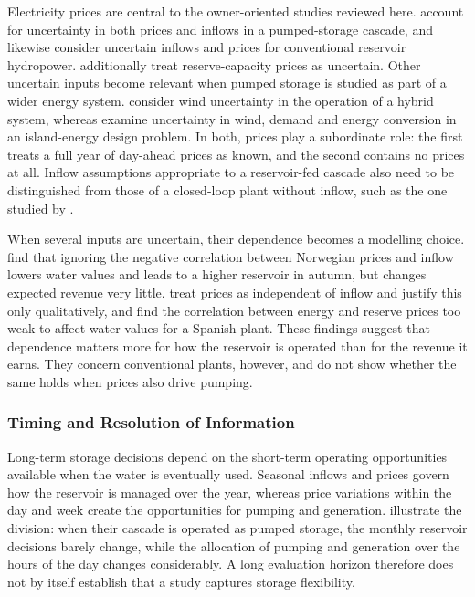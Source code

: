 Electricity prices are central to the owner-oriented studies reviewed
here. \citet{alic2023optimal} account for uncertainty in both prices and
inflows in a pumped-storage cascade, and \citet{bore2026assessing}
likewise consider uncertain inflows and prices for conventional
reservoir hydropower. \citet{helseth2016} additionally treat
reserve-capacity prices as uncertain. Other uncertain inputs become
relevant when pumped storage is studied as part of a wider energy
system. \citet{naval2025optimization} consider wind uncertainty in the
operation of a hybrid system, whereas \citet{zisos2023mixing} examine
uncertainty in wind, demand and energy conversion in an island-energy
design problem. In both, prices play a subordinate role: the first
treats a full year of day-ahead prices as known, and the second contains
no prices at all. Inflow assumptions appropriate to a reservoir-fed
cascade also need to be distinguished from those of a closed-loop plant
without inflow, such as the one studied by \citet{chazarra2017}.

When several inputs are uncertain, their dependence becomes a modelling
choice. \citet{kleiven2023} find that ignoring the negative correlation
between Norwegian prices and inflow lowers water values and leads to a
higher reservoir in autumn, but changes expected revenue very little. \citet{helseth2016} treat prices as independent of inflow
and justify this only qualitatively, and \citet{perezdiaz2020medium} find
the correlation between energy and reserve prices too weak to affect
water values for a Spanish plant. These findings suggest that dependence
matters more for how the reservoir is operated than for the revenue it
earns. They concern conventional plants, however, and do not show
whether the same holds when prices also drive pumping.

\subsubsection{Timing and Resolution of Information}
\label{sec:lit_unc_timing}

Long-term storage decisions depend on the short-term operating
opportunities available when the water is eventually used. Seasonal
inflows and prices govern how the reservoir is managed over the year,
whereas price variations within the day and week create the
opportunities for pumping and generation. \citet{ak2019quantifying}
illustrate the division: when their cascade is operated as pumped
storage, the monthly reservoir decisions barely change, while the
allocation of pumping and generation over the hours of the day changes
considerably. A long evaluation horizon therefore does not by itself
establish that a study captures storage flexibility.

